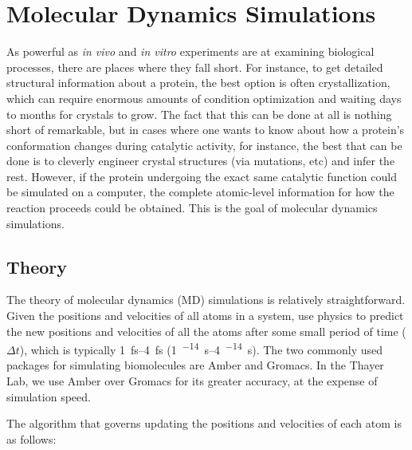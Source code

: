 \section{Molecular Dynamics Simulations}

As powerful as \textit{in vivo} and \textit{in vitro} experiments are at examining biological processes, there are places where they fall short. For instance, to get detailed structural information about a protein, the best option is often crystallization, which can require enormous amounts of condition optimization and waiting days to months for crystals to grow. The fact that this can be done at all is nothing short of remarkable, but in cases where one wants to know about how a protein's conformation changes during catalytic activity, for instance, the best that can be done is to cleverly engineer crystal structures (via mutations, etc) and infer the rest. However, if the protein undergoing the exact same catalytic function could be simulated on a computer, the complete atomic-level information for how the reaction proceeds could be obtained. This is the goal of molecular dynamics simulations.

\subsection{Theory}

The theory of molecular dynamics (MD) simulations is relatively straightforward. Given the positions and velocities of all atoms in a system, use physics to predict the new positions and velocities of all the atoms after some small period of time (\(\Delta t\)), which is typically \qtyrange{1}{4}{\femto\second} (\qtyrange{1}{4}{^{-14} \second}). The two commonly used packages for simulating biomolecules are Amber and Gromacs. In the Thayer Lab, we use Amber over Gromacs for its greater accuracy, at the expense of simulation speed.

The algorithm that governs updating the positions and velocities of each atom is as follows:

